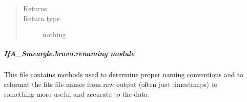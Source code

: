 \documentclass[letterpaper,10pt,english]{sphinxmanual}
\begin{document}
\begin{fulllineitems}
\begin{quote}
\begin{description}
\begin{itemize}
\begin{itemize}
\begin{description}
\end{description}

\end{itemize}


\end{itemize}

\item[{Returns}] \leavevmode


\item[{Return type}] \leavevmode
nothing

\end{description}\end{quote}

\end{fulllineitems}



\subparagraph{IfA\_Smeargle.bravo.renaming module}
\label{\detokenize{python_docstrings/IfA_Smeargle.bravo.renaming:module-IfA_Smeargle.bravo.renaming}}\label{\detokenize{python_docstrings/IfA_Smeargle.bravo.renaming:ifa-smeargle-bravo-renaming-module}}\label{\detokenize{python_docstrings/IfA_Smeargle.bravo.renaming::doc}}
This file contains methods used to determine proper naming conventions and
to reformat the fits file names from raw output  (often just timestamps) to
something more useful and accurate to the data.
\end{document}
